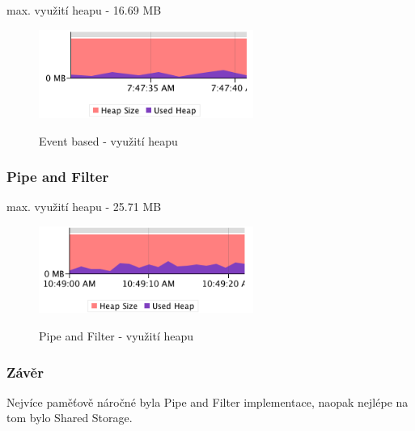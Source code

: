 \documentclass[11pt]{article}
\begin{document}
max. využití heapu - 16.69 MB

\begin{figure}[htbp]
	\caption{Event based - využití heapu}
		\includegraphics[width=7cm]{event-memory}
	\label{fig:event-memory}
\end{figure}

\subsubsection{Pipe and Filter}

max. využití heapu - 25.71 MB

\begin{figure}[htbp]
	\caption{Pipe and Filter - využití heapu}
		\includegraphics[width=7cm]{pipe-memory}
	\label{fig:pipe-memory}
\end{figure}

\subsubsection{Závěr}

Nejvíce paměťově náročné byla Pipe and Filter implementace, naopak nejlépe na tom bylo Shared Storage.
\end{document}
